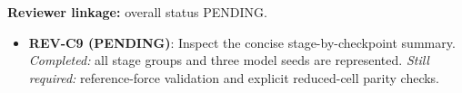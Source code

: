 \textbf{Reviewer linkage:} overall status PENDING.
\begin{itemize}[leftmargin=1.4em,noitemsep]
\item \textbf{REV-C9 (PENDING)}: Inspect the concise stage-by-checkpoint summary. \emph{Completed:} all stage groups and three model seeds are represented. \emph{Still required:} reference-force validation and explicit reduced-cell parity checks.
\end{itemize}
